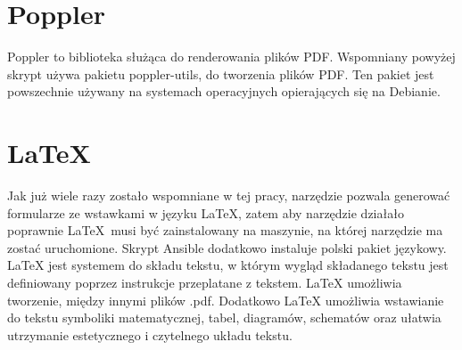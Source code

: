 \section{Poppler}
Poppler\cite{poppler} to biblioteka służąca do renderowania plików PDF. Wspomniany powyżej skrypt
używa pakietu poppler-utils, do tworzenia plików PDF. Ten pakiet jest powszechnie
używany na systemach operacyjnych opierających się na Debianie.

\section{LaTeX}
Jak już wiele razy zostało wspomniane w tej pracy, narzędzie pozwala generować formularze ze 
wstawkami
w języku \LaTeX\cite{latex}, zatem aby narzędzie działało poprawnie \LaTeX\ musi być zainstalowany 
na maszynie, na której narzędzie ma zostać uruchomione. Skrypt Ansible dodatkowo instaluje
polski pakiet językowy.\\
\LaTeX{} jest systemem do składu tekstu, w którym wygląd składanego tekstu jest definiowany
poprzez instrukcje przeplatane z tekstem. \LaTeX{} umożliwia tworzenie, między innymi plików \*.pdf.
Dodatkowo \LaTeX{}
umożliwia wstawianie do tekstu symboliki matematycznej, tabel, diagramów, schematów
oraz ułatwia utrzymanie estetycznego i czytelnego układu tekstu.

